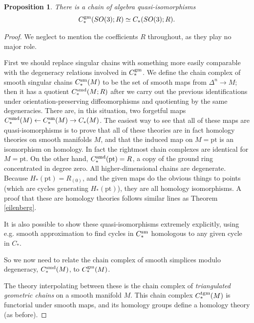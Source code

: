 \documentclass{memo-l}
\newtheorem{proposition}[theorem]{Proposition}
\theoremstyle{definition}
\theoremstyle{remark}
\numberwithin{section}{chapter}
\numberwithin{equation}{chapter}
\begin{document}
\begin{proposition}\label{sm-gm-comparison} There is a chain of algebra quasi-isomorphisms $$C_*^{\textup{gm}}(SO(3);R) \simeq C_*(SO(3);R).$$
\end{proposition}
\begin{proof}
We neglect to mention the coefficients $R$ throughout, as they play no major role.

First we should replace singular chains with something more easily comparable with the degeneracy relations involved in $C_*^{\textup{gm}}$. We define the chain complex of smooth singular chains $C_*^\textup{sm}(M)$ to be the set of smooth maps from $\Delta^n \to M$; then it has a quotient $C_*^\textup{smd}(M;R)$ after we carry out the previous identifications under orientation-preserving diffeomorphisms and quotienting by the same degeneracies. There are, in this situation, two forgetful maps $C_*^\textup{smd}(M) \leftarrow C_*^\textup{sm}(M) \to C_*(M)$. The easiest way to see that all of these maps are quasi-isomorphisms is to prove that all of these theories are in fact homology theories on smooth manifolds $M$, and that the induced map on $M = \text{pt}$ is an isomorphism on homology. In fact the rightmost chain complexes are identical for $M = \text{pt}$. On the other hand, $C_*^\textup{smd}(\text{pt}) = R$, a copy of the ground ring concentrated in degree zero. All higher-dimensional chains are degenerate. Because $H_*(\text{pt}) = R_{(0)}$, and the given maps do the obvious things to points (which are cycles generating $H_*(\text{pt})$), they are all homology isomorphisms. A proof that these are homology theories follows similar lines as Theorem \ref{eilenberg}.

It is also possible to show these quasi-isomorphisms extremely explicitly, using e.g. smooth approximation to find cycles in $C_*^\textup{sm}$ homologous to any given cycle in $C_*$.

So we now need to relate the chain complex of smooth simplices modulo degeneracy, $C_*^\textup{smd}(M)$, to $C_*^{\textup{gm}}(M)$.

The theory interpolating between these is the chain complex of \emph{triangulated geometric chains} on a smooth manifold $M$. This chain complex $C_*^\textup{tgm}(M)$ is functorial under smooth maps, and its homology groups define a homology theory (as before).


\end{proof}
\end{document}

